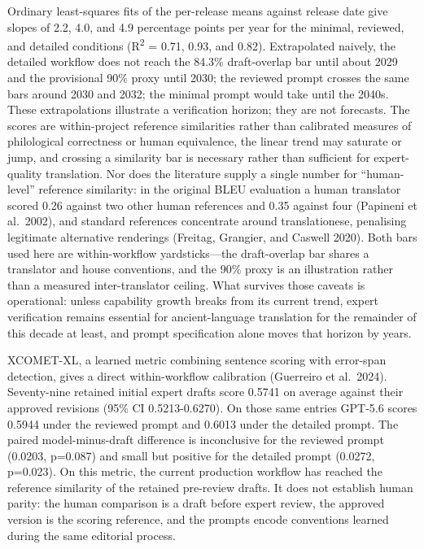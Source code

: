 \documentclass[
  12pt,
]{article}
\begin{document}
Ordinary least-squares fits of the per-release means against release
date give slopes of 2.2, 4.0, and 4.9 percentage points per year for the
minimal, reviewed, and detailed conditions (R\textsuperscript{2} = 0.71,
0.93, and 0.82). Extrapolated naively, the detailed workflow does not
reach the 84.3\% draft-overlap bar until about 2029 and the provisional
90\% proxy until 2030; the reviewed prompt crosses the same bars around
2030 and 2032; the minimal prompt would take until the 2040s. These
extrapolations illustrate a verification horizon; they are not
forecasts. The scores are within-project reference similarities rather
than calibrated measures of philological correctness or human
equivalence, the linear trend may saturate or jump, and crossing a
similarity bar is necessary rather than sufficient for expert-quality
translation. Nor does the literature supply a single number for
``human-level'' reference similarity: in the original BLEU evaluation a
human translator scored 0.26 against two other human references and
0.35 against four (Papineni et al.~2002), and standard references
concentrate around translationese, penalising legitimate alternative
renderings (Freitag, Grangier, and Caswell 2020). Both bars used here
are within-workflow yardsticks---the draft-overlap bar shares a
translator and house conventions, and the 90\% proxy is an illustration
rather than a measured inter-translator ceiling. What survives those caveats is operational: unless
capability growth breaks from its current trend, expert verification
remains essential for ancient-language translation for the remainder of
this decade at least, and prompt specification alone moves that horizon
by years.

XCOMET-XL, a learned metric combining sentence scoring with error-span
detection, gives a direct within-workflow calibration (Guerreiro et
al.~2024). Seventy-nine retained initial expert drafts score 0.5741 on
average against their approved revisions (95\% CI 0.5213-0.6270). On
those same entries GPT-5.6 scores 0.5944 under the reviewed prompt and
0.6013 under the detailed prompt. The paired model-minus-draft
difference is inconclusive for the reviewed prompt (0.0203, p=0.087) and
small but positive for the detailed prompt (0.0272, p=0.023). On this
metric, the current production workflow has reached the reference
similarity of the retained pre-review drafts. It does not
establish human parity: the human comparison is a draft before expert
review, the approved version is the scoring reference, and the prompts
encode conventions learned during the same editorial process.
\end{document}
